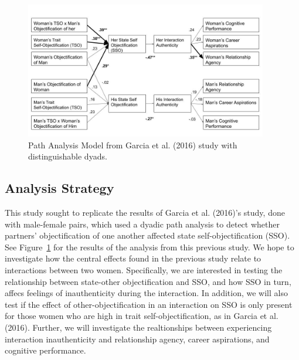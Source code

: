 \documentclass[man]{apa6}
\begin{document}
\begin{figure}
\includegraphics[width=400px]{2016_figure} \caption{Path Analysis Model from Garcia et al. (2016) study with distinguishable dyads.}\label{fig:2016figure}
\end{figure}

\subsection{Analysis Strategy}\label{analysis-strategy}

This study sought to replicate the results of Garcia et al. (2016)'s
study, done with male-female pairs, which used a dyadic path analysis to
detect whether partners' objectification of one another affected state
self-objectification (SSO). See Figure~\ref{fig:2016figure} for the
results of the analysis from this previous study. We hope to investigate
how the central effects found in the previous study relate to
interactions between two women. Specifically, we are interested in
testing the relationship between state-other objectification and SSO,
and how SSO in turn, affecs feelings of inauthenticity during the
interaction. In addition, we will also test if the effect of
other-objectification in an interaction on SSO is only present for those
women who are high in trait self-objectification, as in Garcia et al.
(2016). Further, we will investigate the realtionships between
experiencing interaction inauthenticity and relationship agency, career
aspirations, and cognitive performance.
\end{document}

